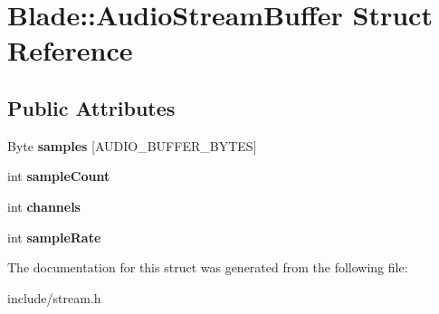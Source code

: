 \hypertarget{struct_blade_1_1_audio_stream_buffer}{}\section{Blade\+:\+:Audio\+Stream\+Buffer Struct Reference}
\label{struct_blade_1_1_audio_stream_buffer}
\subsection*{Public Attributes}
\begin{DoxyCompactItemize}
\item 
\mbox{\label{struct_blade_1_1_audio_stream_buffer_a961d76417b855c7c43cddd248f06271f}} 
Byte {\bfseries samples} \mbox{[}A\+U\+D\+I\+O\+\_\+\+B\+U\+F\+F\+E\+R\+\_\+\+B\+Y\+T\+ES\mbox{]}
\item 
\mbox{\label{struct_blade_1_1_audio_stream_buffer_a654db752e06cab046e268df1fe0af89f}} 
int {\bfseries sample\+Count}
\item 
\mbox{\label{struct_blade_1_1_audio_stream_buffer_ae4d3190d32bd9bab0c8717d1c73299c5}} 
int {\bfseries channels}
\item 
\mbox{\label{struct_blade_1_1_audio_stream_buffer_af6c100e6964680cfc062bc6391c3597a}} 
int {\bfseries sample\+Rate}
\end{DoxyCompactItemize}


The documentation for this struct was generated from the following file\+:\begin{DoxyCompactItemize}
\item 
include/stream.\+h\end{DoxyCompactItemize}
